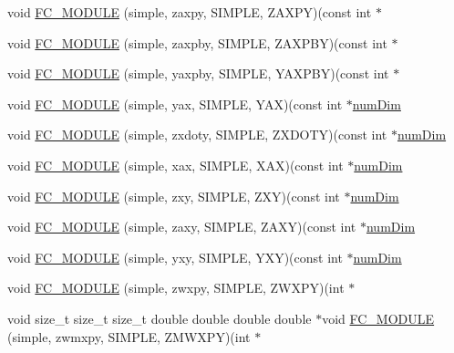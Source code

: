 \begin{DoxyCompactItemize}
\item 
void \hyperlink{SimpleKernels_8H_a9e87ebe6d502bf9a951e38076e97e1a4}{F\+C\+\_\+\+M\+O\+D\+U\+LE} (simple, zaxpy, S\+I\+M\+P\+LE, Z\+A\+X\+PY)(const int $\ast$
\item 
void \hyperlink{SimpleKernels_8H_ab1b0f88e1d0355ca5c439a49fd623b49}{F\+C\+\_\+\+M\+O\+D\+U\+LE} (simple, zaxpby, S\+I\+M\+P\+LE, Z\+A\+X\+P\+BY)(const int $\ast$
\item 
void \hyperlink{SimpleKernels_8H_af0aa29902720278ce9d3d634aba41191}{F\+C\+\_\+\+M\+O\+D\+U\+LE} (simple, yaxpby, S\+I\+M\+P\+LE, Y\+A\+X\+P\+BY)(const int $\ast$
\item 
void \hyperlink{SimpleKernels_8H_a5e26f584315c0bc6da12a293b3548436}{F\+C\+\_\+\+M\+O\+D\+U\+LE} (simple, yax, S\+I\+M\+P\+LE, Y\+AX)(const int $\ast$\hyperlink{SATKernels_8H_a680185db8546de161968dabace9e94f1}{num\+Dim}
\item 
void \hyperlink{SimpleKernels_8H_a565cb707eaca61a07fda105643e1a4b2}{F\+C\+\_\+\+M\+O\+D\+U\+LE} (simple, zxdoty, S\+I\+M\+P\+LE, Z\+X\+D\+O\+TY)(const int $\ast$\hyperlink{SATKernels_8H_a680185db8546de161968dabace9e94f1}{num\+Dim}
\item 
void \hyperlink{SimpleKernels_8H_a4980f3a24e9301993a31fe8d3c4f6065}{F\+C\+\_\+\+M\+O\+D\+U\+LE} (simple, xax, S\+I\+M\+P\+LE, X\+AX)(const int $\ast$\hyperlink{SATKernels_8H_a680185db8546de161968dabace9e94f1}{num\+Dim}
\item 
void \hyperlink{SimpleKernels_8H_a779f52c1872e0e2eb2064c48d77d6144}{F\+C\+\_\+\+M\+O\+D\+U\+LE} (simple, zxy, S\+I\+M\+P\+LE, Z\+XY)(const int $\ast$\hyperlink{SATKernels_8H_a680185db8546de161968dabace9e94f1}{num\+Dim}
\item 
void \hyperlink{SimpleKernels_8H_ae7fb3291ddbcf11e489a81e5fc7285d9}{F\+C\+\_\+\+M\+O\+D\+U\+LE} (simple, zaxy, S\+I\+M\+P\+LE, Z\+A\+XY)(const int $\ast$\hyperlink{SATKernels_8H_a680185db8546de161968dabace9e94f1}{num\+Dim}
\item 
void \hyperlink{SimpleKernels_8H_a237a6451d95d7423ca050660f012939e}{F\+C\+\_\+\+M\+O\+D\+U\+LE} (simple, yxy, S\+I\+M\+P\+LE, Y\+XY)(const int $\ast$\hyperlink{SATKernels_8H_a680185db8546de161968dabace9e94f1}{num\+Dim}
\item 
void \hyperlink{SimpleKernels_8H_ac72c5cfb6e621693206556a7aa45da0b}{F\+C\+\_\+\+M\+O\+D\+U\+LE} (simple, zwxpy, S\+I\+M\+P\+LE, Z\+W\+X\+PY)(int $\ast$
\item 
void size\+\_\+t size\+\_\+t size\+\_\+t double double double double $\ast$void \hyperlink{SimpleKernels_8H_aab57e6641df726e7d4d0795fdb8d2952}{F\+C\+\_\+\+M\+O\+D\+U\+LE} (simple, zwmxpy, S\+I\+M\+P\+LE, Z\+M\+W\+X\+PY)(int $\ast$

\end{DoxyCompactItemize}
